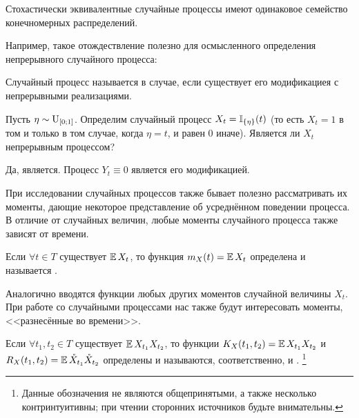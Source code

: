 \begin{statement}
    \label{statement:basics:finite_distributions_of_modifications}
    Стохастически эквивалентные случайные процессы имеют одинаковое семейство конечномерных распределений.
\end{statement}

Например, такое отождествление полезно для осмысленного определения непрерывного случайного процесса:
\begin{definition}
    \label{definition:basics:continious_stochastic_process}
    Случайный процесс называется  в случае,
    если существует его модификациея с непрерывными реализациями.
\end{definition}

\begin{Exercise}[counter=SecExercise, label={exercise:basics:continious_stochastic_process}]
    \noindent
    Пусть $ \eta \sim \textnormal{U}_{[0;1]} $.
    Определим случайный процесс $ X_t = \mathbb{I}_{\{\eta\}}(t) $
    (то есть $ X_t = 1 $ в том и только в том случае, когда $ \eta = t $, и равен $ 0 $ иначе).
    Является ли $ X_t $ непрерывным процессом?
\end{Exercise}

\begin{Answer}
    \noindent
    Да, является.
    Процесс $ Y_t \equiv 0 $ является его модификацией.
\end{Answer}


При исследовании случайных процессов также бывает полезно рассматривать их моменты,
дающие некоторое представление об усреднённом поведении процесса.
В отличие от случайных величин, любые моменты случайного процесса также зависят от времени.

\begin{definition}
    \label{definition:basics:mean_function}
    Если $ \forall t \in T $ существует $ \operatorname{\mathbb{E}} X_t $,
    то функция $ m_X(t) = \operatorname{\mathbb{E}} X_t $ определена и называется .
\end{definition}

Аналогично вводятся функции любых других моментов случайной величины $ X_t $.
При работе со случайными процессами нас также будут интересовать моменты,
<<разнесённые во времени>>.

\begin{definition}
    \label{definition:basics:second_order_moment_functions}
    Если $ \forall t_1, t_2 \in T $ существует $ \operatorname{\mathbb{E}} X_{t_1} X_{t_2} $,
    то функции $ K_X(t_1, t_2) = \operatorname{\mathbb{E}} X_{t_1} X_{t_2} $ и $ R_X(t_1, t_2) = \operatorname{\mathbb{E}} \mathring{X}_{t_1} \mathring{X}_{t_2} $
    определены и называются, соответственно,  и .%
    \footnote{Данные обозначения не являются общепринятыми, а также несколько контринтуитивны; при чтении сторонних источников будьте внимательны.}
\end{definition}

